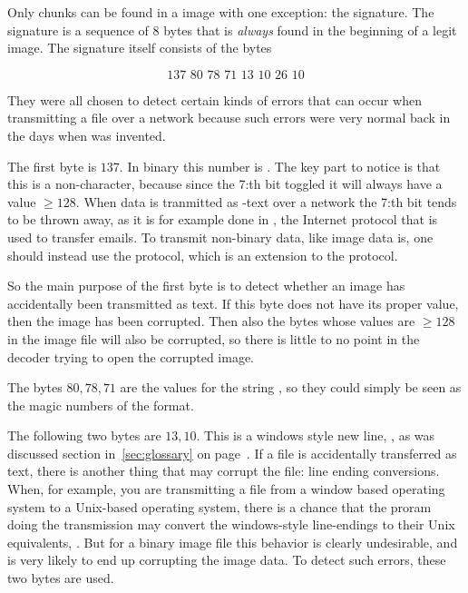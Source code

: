 Only chunks can be found in a \png image with one exception: the \png
signature. The \png signature is a sequence of 8 bytes that is
\textit{always} found in the beginning of a legit \png image. The
signature itself consists of the bytes

\begin{equation*}
  \text{137 80 78 71 13 10 26 10}
\end{equation*}

They were all chosen to detect certain kinds of errors that can occur
when transmitting a \png file over a network because such errors were
very normal back in the days when \png was invented.

The first byte is $137$. In binary this number is . The key
part to notice is that this is a non-\ascii character, because since
the 7:th bit toggled it will always have a value $\ge 128$. When data
is tranmitted as \ascii-text over a network the 7:th bit tends to be
thrown away, as it is for example done in \stmp \cite{rfc5321}, the
Internet protocol that is used to transfer emails. To transmit
non-\ascii binary data, like image data is, one should instead use the
\mime protocol, which is an extension to the \stmp protocol.

So the main purpose of the first byte is to detect whether an image
has accidentally been transmitted as \ascii text. If this byte does not
have its proper value, then the image has been corrupted. Then also
the bytes whose values are $\ge 128$ in the image file will also be
corrupted, so there is little to no point in the decoder trying to open
the corrupted image.

The bytes $80, 78, 71$ are the \ascii values for the string \png, so
they could simply be seen as the magic numbers of the \png format.

The following two bytes are $13, 10$. This is a windows style new
line, \crlf, as was discussed section in~\ref{sec:glossary} on page~\pageref{sec:glossary}. If a \png file is accidentally transferred as
text, there is another thing that may corrupt the file: line ending
conversions. When, for example, you are transmitting a file from a
window based operating system to a Unix-based operating system, there
is a chance that the proram doing the transmission may convert the
windows-style line-endings to their Unix equivalents, \lf. But for a
binary image file this behavior is clearly undesirable, and is very
likely to end up corrupting the image data. To detect such errors,
these two bytes are used.

